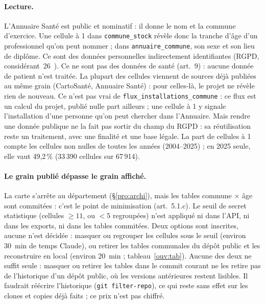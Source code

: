 \paragraph{Lecture.}
L'Annuaire Santé est public et nominatif : il donne le nom et la commune d'exercice.
Une cellule à 1 dans \texttt{commune\_\allowbreak{}stock} révèle donc la tranche d'âge d'un professionnel qu'on peut nommer ; dans \texttt{annuaire\_\allowbreak{}commune}, son sexe et son lieu de diplôme.
Ce sont des données personnelles indirectement identifiantes (RGPD, considérant~26~\citep{e-rgpd}). Ce ne sont pas des données de santé (art.~9) : aucune donnée de patient n'est traitée.
La plupart des cellules viennent de sources déjà publiées au même grain (CartoSanté, Annuaire Santé) : pour celles-là, le projet ne révèle rien de nouveau.
Ce n'est pas vrai de \texttt{flux\_\allowbreak{}installations\_\allowbreak{}commune} : ce flux est un calcul du projet, publié nulle part ailleurs ; une cellule à 1 y signale l'installation d'une personne qu'on peut chercher dans l'Annuaire.
Mais rendre une donnée publique ne la fait pas sortir du champ du RGPD : sa réutilisation reste un traitement, avec une finalité et une base légale.
La part de cellules à 1 compte les cellules non nulles de toutes les années (2004--2025) ; en 2025 seule, elle vaut 49,2\mesure{}\,\% (33\,390\mesure{} cellules sur 67\,914\mesure{}).

\paragraph{Le grain publié dépasse le grain affiché.}
La carte s'arrête au département (§\ref{pro:archi}), mais les tables commune $\times$ âge sont commitées : c'est le point de minimisation (art.~5.1.c).
Le seuil de secret statistique (cellules $\geq 11$\suppose{}, ou $<5$\suppose{} regroupées) n'est appliqué ni dans l'API, ni dans les exports, ni dans les tables commitées.
Deux options sont inscrites, aucune n'est décidée : masquer ou regrouper les cellules sous le seuil (environ 30\suppose{}~min de temps Claude), ou retirer les tables communales du dépôt public et les reconstruire en local (environ 20\suppose{}~min ; tableau~\ref{ouv:tab}).
Aucune des deux ne suffit seule : masquer ou retirer les tables dans le commit courant ne les retire pas de l'historique d'un dépôt public, où les versions antérieures restent lisibles.
Il faudrait réécrire l'historique (\texttt{git filter-repo}), ce qui reste sans effet sur les clones et copies déjà faits ; ce prix n'est pas chiffré.

